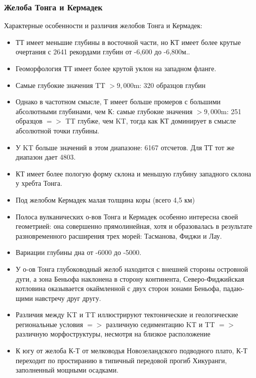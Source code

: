 \documentclass[pdflatex,compress,8pt,
	xcolor={dvipsnames,dvipsnames,svgnames,x11names,table},
	hyperref={colorlinks = true,breaklinks = true, urlcolor = NavyBlue}]{beamer}
\begin{document}
\begin{frame}\frametitle{Желоба Тонга и Кермадек}
Характерные особенности и различия желобов Тонга и Кермадек: 
\begin{itemize}\small
            \item ТТ имеет меньшие глубины в восточной части, но КТ имеет более крутые очертания с 2641 рекордами глубин от -6,600 до -6,800м.. 
            \item Геоморфология ТТ имеет более крутой уклон на западном фланге. 
            \item Самые глубокие значения TT $>9,000$m: 320 образцов глубин
            \item Однако в частотном смысле, Т имеет больше промеров с большими абсолютными глубинами, чем К: самые глубокие значения $>9,000$m: 251 образцов $=>$  TT глубже, чем KT, тогда как КТ доминирует в смысле абсолютной точки глубины.
            \item У KT больше значений в этом диапазоне: 6167 отсчетов. Для ТТ тот же диапазон дает 4803.
            \item КТ имеет более пологую форму склона и меньшую глубину западного склона у хребта Тонга.
            \item Под желобом Кермадек малая толщина коры (всего 4,5 км)
            \item Полоса вулканических о-вов Тонга и Кермадек особенно интересна своей геометрией: она совершенно прямолинейная, хотя и образовалась в результате разновре­менного расширения трех морей: Тасманова, Фиджи и Лау.
            \item Вариации глубины дна от -6000 до -5000.
            \item У о-ов Тонга глубоководный желоб находится с внешней стороны островной дуги, а зона Беньофа наклонена в сторону континента, Северо-Фиджийская котловина ока­зывается окаймленной с двух сторон зонами Беньофа, падаю­щими навстречу друг другу.
            \item Различия между KT и TT иллюстрируют тектонические и геологические региональные условия $=>$ различную седиментацию KT и TT $=>$ различную морфоструктуры, несмотря на близкое расположение         
            \item К югу от желоба К-Т от мелководья Новозеландского подводного плато, К-Т переходит по про­стиранию в типичный передовой прогиб Хикуранги, заполнен­ный мощными осадками.
\end{itemize}	
\end{frame}
\end{document}

